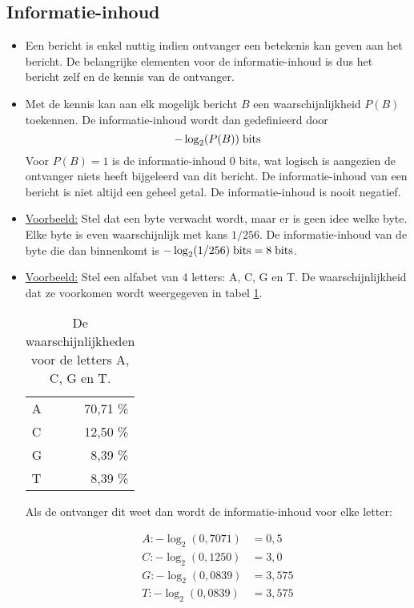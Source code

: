 \subsection{Informatie-inhoud}
	\begin{itemize}
		\item Een bericht is enkel nuttig indien ontvanger een betekenis kan geven aan het bericht. De belangrijke elementen voor de informatie-inhoud is dus het bericht zelf en de kennis van de ontvanger.
		\item Met de kennis kan aan elk mogelijk bericht $B$ een waarschijnlijkheid $P(B)$ toekennen. De informatie-inhoud wordt dan gedefinieerd door
		$$-\log_2(P(B))\; \hbox{bits}$$ 
		Voor $P(B) = 1$ is de informatie-inhoud 0 bits, wat logisch is aangezien de ontvanger niets heeft bijgeleerd van dit bericht.
		\alert De informatie-inhoud van een bericht is niet altijd een geheel getal.
		\alert De informatie-inhoud is nooit negatief.
		\item \underline{Voorbeeld:} Stel dat een byte verwacht wordt, maar er is geen idee welke byte. Elke byte is even waarschijnlijk met kans $1/256$. De informatie-inhoud van de byte die dan binnenkomt is $-\log_2 (1/256)\;\hbox{bits} = 8 \;\hbox{bits}$.
		\item \underline{Voorbeeld:} Stel een alfabet van 4 letters: A, C, G en T. De waarschijnlijkheid dat ze voorkomen wordt weergegeven in tabel \ref{table:example_entropy}.
		\begin{table}[h]
			\centering
			\begin{tabular}{l | r}
				A & 70,71 \% \\
				C & 12,50 \% \\
				G &  8,39 \% \\
				T & 8,39 \% \\
			\end{tabular}
			\caption{De waarschijnlijkheden voor de letters A, C, G en T.}
			\label{table:example_entropy}
		\end{table}
	
		Als de ontvanger dit weet dan wordt de informatie-inhoud voor elke letter:
		
		\begin{equation*}
			\begin{split}
				A: -\log_2(0,7071) & = 0,5 \\
				C: -\log_2(0,1250) & = 3,0 \\
				G: -\log_2(0,0839) & = 3,575\\
				T: -\log_2(0,0839) & = 3,575
			\end{split}
		\end{equation*}
	\end{itemize}
